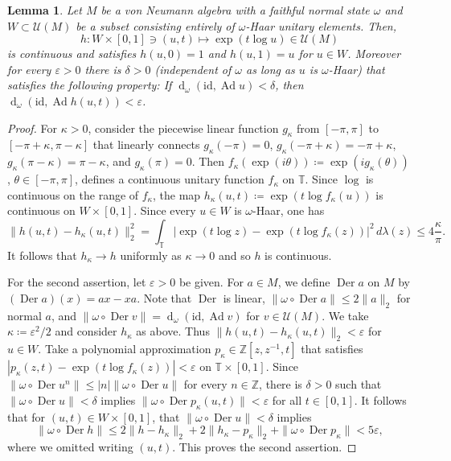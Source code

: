 \documentclass[12pt,nosumlimits,nonamelimits]{amsart}
\newtheorem{lem}[thm]{Lemma}
\theoremstyle{remark}
\newcommand{\IT}{\mathbb{T}}
\newcommand{\IZ}{\mathbb{Z}}
\newcommand{\cU}{\mathcal{U}}
\newcommand{\ve}{\varepsilon}
\newcommand{\id}{\mathrm{id}}
\DeclareMathOperator{\Ad}{Ad}
\DeclareMathOperator{\Der}{Der}
\DeclareMathOperator{\dist}{d}
\begin{document}
\begin{lem}\label{lem:haar}
Let $M$ be a von Neumann algebra with 
a faithful normal state $\omega$ and 
$W\subset\cU(M)$ be a subset consisting entirely 
of $\omega$-Haar unitary elements. 
Then, 
\[
h\colon W\times[0,1] \ni(u,t) \mapsto \exp(t\log u)\in\cU(M)
\]
is continuous and satisfies $h(u,0)=1$ and $h(u,1)=u$ for $u\in W$.
Moreover for every $\ve>0$ there is $\delta>0$ 
(independent of $\omega$ as long as $u$ is $\omega$-Haar) 
that satisfies the following property: 
If $\dist_\omega(\id,\Ad u)<\delta$, 
then $\dist_\omega(\id,\Ad h(u,t))<\ve$. 
\end{lem}
\begin{proof}
For $\kappa > 0$, consider the piecewise linear function 
$g_\kappa$ from $[-\pi,\pi]$ to $[-\pi+\kappa,\pi-\kappa]$ 
that linearly connects $g_\kappa(-\pi)=0$, 
$g_\kappa(-\pi+\kappa)=-\pi+\kappa$, 
$g_\kappa(\pi-\kappa)=\pi-\kappa$, 
and $g_\kappa(\pi)=0$.
Then 
$f_\kappa(\exp(i\theta))\coloneqq\exp( i g_\kappa(\theta))$, 
$\theta\in[-\pi,\pi]$, 
defines a continuous unitary function $f_\kappa$ on $\IT$. 
Since $\log$ is continuous on the range of $f_\kappa$, the map 
$h_\kappa(u,t) \coloneqq \exp(t\log f_\kappa(u))$ is continuous 
on $W\times[0,1]$. 
Since every $u\in W$ is $\omega$-Haar, one has 
\[
\| h(u,t) - h_\kappa(u,t) \|_2^2 
=\int_{\IT}|\exp( t \log z ) - \exp( t\log f_\kappa(z) )|^2\,d\lambda(z)
\le 4\frac{\kappa}{\pi}.
\]
It follows that $h_\kappa\to h$ uniformly as $\kappa\to0$ 
and so $h$ is continuous. 

For the second assertion, let $\ve>0$ be given.
For $a\in M$, we define $\Der a$ on $M$ 
by $(\Der a)(x)=ax-xa$. 
Note that $\Der$ is linear, $\|\omega\circ\Der a\|\le2\|a\|_2$ 
for normal $a$, 
and $\|\omega\circ\Der v\|=\dist_\omega(\id,\Ad v)$ 
for $v\in\cU(M)$. 
We take $\kappa\coloneqq\ve^2/2$ and 
consider $h_\kappa$ as above. 
Thus $\| h(u,t)-h_\kappa(u,t)\|_2<\ve$ for $u\in W$.
Take a polynomial approximation $p_\kappa\in\IZ[z,z^{-1},t]$ 
that satisfies
$| p_\kappa(z,t) - \exp(t\log f_\kappa(z))|<\ve$ 
on $\IT\times[0,1]$. 
Since $\|\omega\circ\Der u^n\|\le|n|\|\omega\circ\Der u\|$ 
for every $n\in\IZ$, there is $\delta>0$ 
such that $\|\omega\circ\Der u\|<\delta$ 
implies $\| \omega\circ\Der p_\kappa(u,t) \|<\ve$ for all $t\in[0,1]$. 
It follows that for $(u,t)\in W\times[0,1]$, that 
$\|\omega\circ\Der u\|<\delta$ implies 
\[
\|\omega\circ\Der h\|
\le 2\| h - h_\kappa\|_2
 + 2\|h_\kappa-p_\kappa \|_2
 + \| \omega\circ\Der p_\kappa \|
 < 5\ve, 
\]
where we omitted writing $(u,t)$. 
This proves the second assertion. 
\end{proof}
\end{document}
